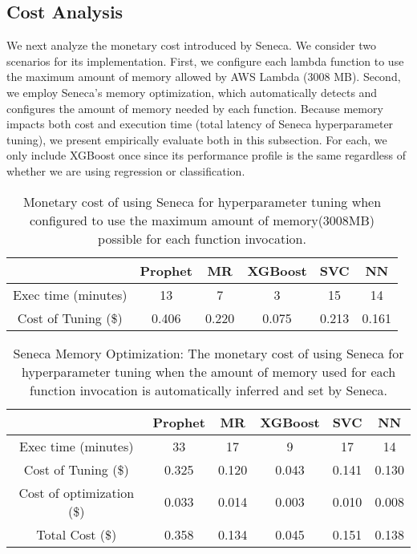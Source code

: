 \subsection{Cost Analysis}

We next analyze the monetary cost introduced by Seneca. 
We consider two scenarios for its implementation.
First, we configure each lambda function to use the maximum amount
of memory allowed by AWS Lambda (3008 MB).  Second, we employ Seneca's memory optimization,
which automatically detects and configures the amount of memory needed by each function.
Because memory impacts both cost and execution time (total latency of Seneca 
hyperparameter tuning), we present empirically evaluate both 
in this subsection.  For each, we only include XGBoost once since its 
performance profile is the same
regardless of whether we are using regression or classification.

\begin{table}
\centering
\begin{tabular}{|c|c|c|c|c|c|}
\hline
& Prophet & MR & XGBoost & SVC & NN\\
\hline
\hline
Exec time (minutes)& 13 & 7 & 3 & 15 & 14 \\
\hline
Cost of Tuning (\$) &0.406 & 0.220 & 0.075 & 0.213 & 0.161 \\
\hline
\end{tabular}
\caption{Monetary cost of using Seneca for hyperparameter 
tuning when configured to use the maximum amount of memory(3008MB) 
possible for each function invocation. 
\label{tab:cost_max_memory}}
\vspace{-0.2in}
\end{table}

\begin{table}
\centering
\begin{tabular}{|c|c|c|c|c|c|}
\hline
& Prophet & MR & XGBoost & SVC & NN\\
\hline
\hline
Exec time (minutes)& 33 & 17 & 9 & 17 & 14 \\
\hline
Cost of Tuning (\$) &0.325 & 0.120 & 0.043 & 0.141 & 0.130 \\
\hline
Cost of optimization (\$) &0.033 & 0.014 & 0.003 & 0.010 & 0.008 \\
\hline
Total Cost (\$) &0.358 & 0.134 & 0.045 & 0.151 & 0.138 \\
\hline
\end{tabular}
\caption{Seneca  Memory  Optimization:  The  monetary  cost  of 
using Seneca for hyperparameter tuning when the amount of memory  
used  for  each  function  invocation  is  automatically
inferred and set by Seneca.
\label{tab:cost_optimized}}
\vspace{-0.2in}
\end{table}

